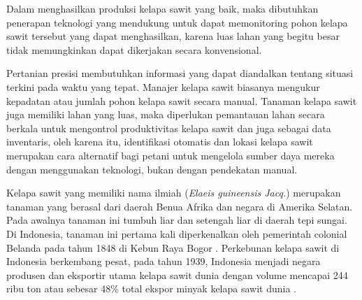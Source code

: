 Dalam menghasilkan produksi kelapa sawit yang baik, maka dibutuhkan penerapan teknologi yang mendukung untuk dapat memonitoring pohon kelapa sawit tersebut yang dapat menghasilkan, karena luas lahan yang begitu besar tidak memungkinkan dapat dikerjakan secara konvensional.

Pertanian presisi membutuhkan informasi yang dapat diandalkan tentang situasi terkini pada waktu yang tepat. Manajer kelapa sawit biasanya mengukur kepadatan atau jumlah pohon kelapa sawit secara manual. Tanaman kelapa sawit juga memiliki lahan yang luas, maka diperlukan pemantauan lahan secara berkala untuk mengontrol produktivitas kelapa sawit dan juga sebagai data inventaris, oleh karena itu, identifikasi otomatis dan lokasi kelapa sawit merupakan cara alternatif bagi petani untuk mengelola sumber daya mereka dengan menggunakan teknologi, bukan dengan pendekatan manual.

Kelapa sawit yang memiliki nama ilmiah (\textit{Elaeis guineensis Jacq.}) merupakan tanaman yang berasal dari daerah Benua Afrika dan negara di Amerika Selatan. Pada awalnya tanaman ini tumbuh liar dan setengah liar di daerah tepi sungai. Di Indonesia, tanaman ini pertama kali diperkenalkan oleh pemerintah colonial Belanda pada tahun 1848 di Kebun Raya Bogor \citep{IPahan2018}. Perkebunan kelapa sawit di Indonesia berkembang pesat, pada tahun 1939, Indonesia menjadi negara produsen dan eksportir utama kelapa sawit dunia dengan volume mencapai 244 ribu ton atau sebesar 48\% total ekspor minyak kelapa sawit dunia \citep{prayitno2008produktivitas}.

